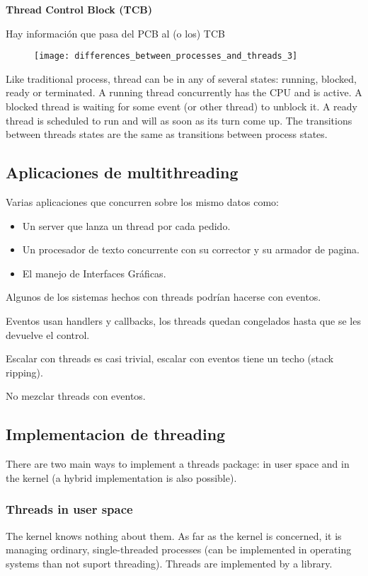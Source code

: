 \documentclass[a4paper, twoside]{article}
\begin{document}
\textbf{Thread Control Block (TCB)}

Hay información que pasa del PCB al (o los) TCB

\begin{figure}[H]
	\centering
	\texttt{[image: differences\_between\_processes\_and\_threads\_3]}
	\label{fig:differences_between_processes_and_threads_3}
\end{figure}

Like traditional process, thread can be in any of several states: running, blocked, ready or terminated. A running thread concurrently has the CPU and is active. A blocked thread is waiting for some event (or other thread) to unblock it. A ready thread is scheduled to run and will as soon as its turn come up. The transitions between threads states are the same as transitions between process states.

\subsection{Aplicaciones de multithreading}
Varias aplicaciones que concurren sobre los mismo datos como:
\begin{itemize}
	\item Un server que lanza un thread por cada pedido.
	\item Un procesador de texto concurrente con su corrector y su armador de pagina.
	\item El manejo de Interfaces Gráficas.
\end{itemize}

Algunos de los sistemas hechos con threads podrían hacerse con eventos.

Eventos usan handlers y callbacks, los threads quedan congelados hasta que se les devuelve el control.

Escalar con threads es casi trivial, escalar con eventos tiene un techo (stack ripping).

No mezclar threads con eventos.

\subsection{Implementacion de threading}
There are two main ways to implement a threads package: in user space and in the kernel (a hybrid implementation is also possible).

\subsubsection{Threads in user space}
The kernel knows nothing about them. As far as the kernel is concerned, it is managing ordinary, single-threaded processes (can be implemented in operating systems than not suport threading). Threads are implemented by a library.
\end{document}

